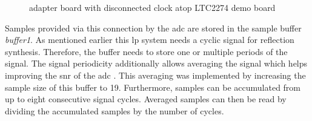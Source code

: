\documentclass[12pt,a4paper,parskip=full,abstract=true,BCOR=12mm]{scrreprt}
\def\device#1{\mbox{\textit{#1}}}
\begin{document}
\begin{figure}[htb]
    \centering
    \caption{ adapter board with disconnected clock atop LTC2274 demo board}
    \label{fig:adc_adapter_circ}
\end{figure}

Samples provided via this connection by the \gls{adc} are stored in the sample buffer
\device{buffer1}. As mentioned earlier this \gls{lp} system needs a cyclic signal for
reflection synthesis. Therefore, the buffer needs to store one or multiple
periods of the signal. The signal periodicity additionally allows averaging the signal which helps
improving the \gls{snr} of the \gls{adc} \cite{ad_mt004}. This averaging was implemented by increasing
the sample size of this buffer to \SI{19}{\bit}. Furthermore, samples can be accumulated
from up to eight consecutive signal cycles. Averaged samples can then be read by dividing the
accumulated samples by the number of cycles.
\end{document}
